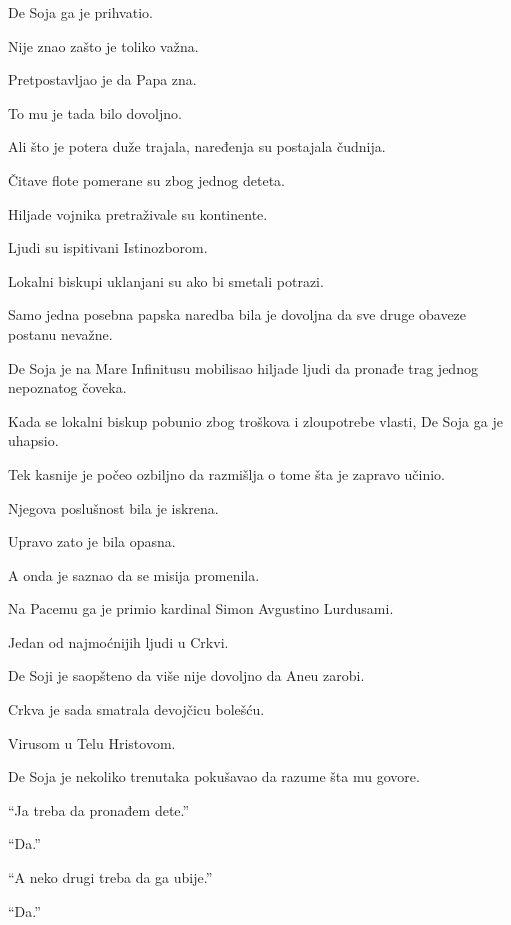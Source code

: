 De Soja ga je prihvatio.

Nije znao zašto je toliko važna.

Pretpostavljao je da Papa zna.

To mu je tada bilo dovoljno.

\bigskip

Ali što je potera duže trajala, naređenja su postajala čudnija.

Čitave flote pomerane su zbog jednog deteta.

Hiljade vojnika pretraživale su kontinente.

Ljudi su ispitivani Istinozborom.

Lokalni biskupi uklanjani su ako bi smetali potrazi.

Samo jedna posebna papska naredba bila je dovoljna da sve druge obaveze postanu nevažne.

\bigskip

De Soja je na Mare Infinitusu mobilisao hiljade ljudi da pronađe trag jednog nepoznatog čoveka.

Kada se lokalni biskup pobunio zbog troškova i zloupotrebe vlasti, De Soja ga je uhapsio.

Tek kasnije je počeo ozbiljno da razmišlja o tome šta je zapravo učinio.

\bigskip

Njegova poslušnost bila je iskrena.

Upravo zato je bila opasna.

\bigskip

A onda je saznao da se misija promenila.

\bigskip

Na Pacemu ga je primio kardinal Simon Avgustino Lurdusami.

Jedan od najmoćnijih ljudi u Crkvi.

De Soji je saopšteno da više nije dovoljno da Aneu zarobi.

\bigskip

Crkva je sada smatrala devojčicu bolešću.

Virusom u Telu Hristovom.

\bigskip

De Soja je nekoliko trenutaka pokušavao da razume šta mu govore.

``Ja treba da pronađem dete.''

``Da.''

``A neko drugi treba da ga ubije.''

``Da.''

\bigskip

